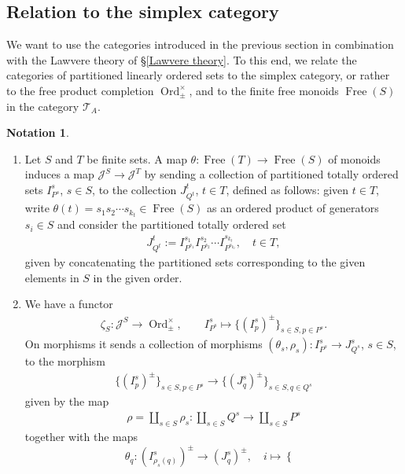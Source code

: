 \documentclass[12pt, reqno]{amsart}
\theoremstyle{plain}
\theoremstyle{definition}
\newtheorem{notation}[theorem]{Notation}
\begin{document}
\subsection{Relation to the simplex category}

We want to use the categories introduced in the previous section in combination with the Lawvere theory of \S \ref{Lawvere theory}. To this end, we relate the categories of partitioned linearly ordered sets to the simplex category, or rather to the free product completion $\operatorname{Ord}_\pm^\times$, and to the finite free monoids $\operatorname{Free}(S)$ in the category $\mathcal{T}_A$.

\begin{notation}\label{J and monoids and Ord}
\ 
\begin{enumerate}
\item Let $S$ and $T$ be finite sets. A map $\theta\colon \operatorname{Free}(T)\rightarrow \operatorname{Free}(S)$ of monoids induces a map $\mathcal{J}^S\rightarrow \mathcal{J}^T$ by sending a collection of partitioned totally ordered sets $I^s_{P^s}$, $s\in S$, to the collection $J^t_{Q^t}$, $t\in T$, defined as follows: given $t\in T$, write $\theta(t)=s_1s_2\cdots s_{k_t}\in \operatorname{Free}(S)$ as an ordered product of generators $s_i\in S$ and consider the partitioned totally ordered set
\begin{align*}
J^t_{Q^t}:=I^{s_1}_{P^{s_1}} I^{s_2}_{P^{s_2}}\cdots I^{s_{k_t}}_{P^{s_{k_t}}},\quad t\in T,
\end{align*}
given by concatenating the partitioned sets corresponding to the given elements in $S$ in the given order.
\item We have a functor
\begin{align*}
\zeta_S\colon \mathcal{J}^S\rightarrow \operatorname{Ord}_{\pm}^\times, \qquad I^s_{P^s}\mapsto \{(I_p^s)^\pm\}_{s\in S,p\in P^s}.
\end{align*}
On morphisms it sends a collection of morphisms $(\theta_s,\rho_s)\colon I^s_{P^s}\rightarrow J^s_{Q^s}$, $s\in S$, to the morphism
\begin{align*}
\{(I_p^s)^\pm\}_{s\in S,p\in P^s}\rightarrow \{(J^s_q)^\pm\}_{s\in S,q\in Q^s}
\end{align*}
given by the map
\begin{align*}
\rho=\coprod_{s\in S}\rho_s\colon \coprod_{s\in S} Q^s\rightarrow \coprod_{s\in S} P^s
\end{align*}
together with the maps
\begin{equation*}
\theta_q\colon (I^s_{\rho_s(q)})^\pm \rightarrow (J^s_q)^\pm,\quad i\mapsto \begin{cases}

\end{cases}
\end{equation*}
\end{enumerate}
\end{notation}
\end{document}
